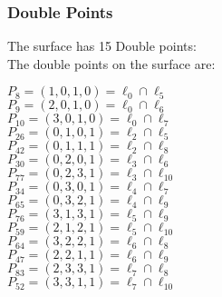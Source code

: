 \documentclass{article}
\begin{document}
{\subsubsection*{Double Points}
The surface has 15 Double points:\\
The double points on the surface are:\\
\begin{multicols}{2}
\noindent
$P_{8} = ( 1, 0, 1, 0 ) = \ell_{0} \cap \ell_{5} $\\
$P_{9} = ( 2, 0, 1, 0 ) = \ell_{0} \cap \ell_{6} $\\
$P_{10} = ( 3, 0, 1, 0 ) = \ell_{0} \cap \ell_{7} $\\
$P_{26} = ( 0, 1, 0, 1 ) = \ell_{2} \cap \ell_{5} $\\
$P_{42} = ( 0, 1, 1, 1 ) = \ell_{2} \cap \ell_{8} $\\
$P_{30} = ( 0, 2, 0, 1 ) = \ell_{3} \cap \ell_{6} $\\
$P_{77} = ( 0, 2, 3, 1 ) = \ell_{3} \cap \ell_{10} $\\
$P_{34} = ( 0, 3, 0, 1 ) = \ell_{4} \cap \ell_{7} $\\
$P_{65} = ( 0, 3, 2, 1 ) = \ell_{4} \cap \ell_{9} $\\
$P_{76} = ( 3, 1, 3, 1 ) = \ell_{5} \cap \ell_{9} $\\
$P_{59} = ( 2, 1, 2, 1 ) = \ell_{5} \cap \ell_{10} $\\
$P_{64} = ( 3, 2, 2, 1 ) = \ell_{6} \cap \ell_{8} $\\
$P_{47} = ( 2, 2, 1, 1 ) = \ell_{6} \cap \ell_{9} $\\
$P_{83} = ( 2, 3, 3, 1 ) = \ell_{7} \cap \ell_{8} $\\
$P_{52} = ( 3, 3, 1, 1 ) = \ell_{7} \cap \ell_{10} $\\
\end{multicols}
}
\end{document}
